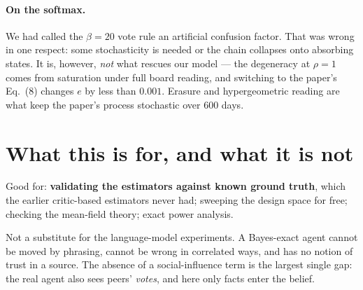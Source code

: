 \documentclass[11pt,a4paper]{article}
\begin{document}
\paragraph{On the softmax.} We had called the $\beta=20$ vote rule an artificial
confusion factor. That was wrong in one respect: some stochasticity is needed or
the chain collapses onto absorbing states. It is, however, \emph{not} what
rescues our model --- the degeneracy at $\rho=1$ comes from saturation under
full board reading, and switching to the paper's Eq.~(8) changes $e$ by less
than $0.001$. Erasure and hypergeometric reading are what keep the paper's
process stochastic over 600 days.

\section{What this is for, and what it is not}

Good for: \textbf{validating the estimators against known ground truth}, which
the earlier critic-based estimators never had; sweeping the design space for
free; checking the mean-field theory; exact power analysis.

Not a substitute for the language-model experiments. A Bayes-exact agent cannot
be moved by phrasing, cannot be wrong in correlated ways, and has no notion of
trust in a source. The absence of a social-influence term is the largest single
gap: the real agent also sees peers' \emph{votes}, and here only facts enter the
belief.
\end{document}
